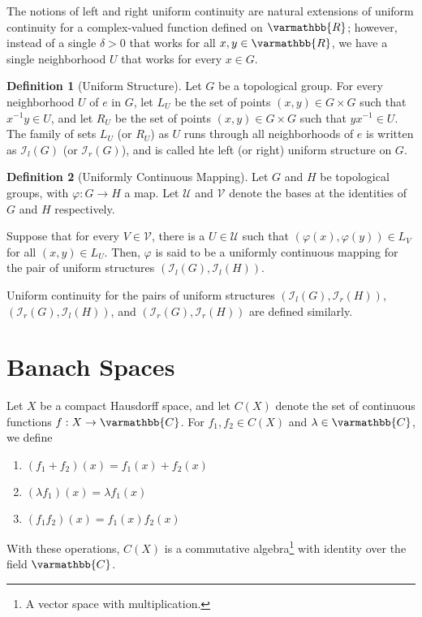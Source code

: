 \documentclass[12pt]{extarticle}
\newcommand{\R}{\mathbb{R}}
\newcommand{\C}{\mathbb{C}}
\theoremstyle{plain}
\theoremstyle{definition}
\newtheorem*{definition}{Definition}
\theoremstyle{note}
\renewcommand*{\mathbb}[1]{\varmathbb{#1}}
\renewcommand{\newline}{\hfill\break}
\begin{document}
 The notions of left and right uniform continuity are natural extensions of uniform continuity for a complex-valued function defined on $\R$; however, instead of a single $\delta > 0$ that works for all $x,y\in \R$, we have a single neighborhood $U$ that works for every $x\in G$.
 \begin{definition}[Uniform Structure]
   Let $G$ be a topological group. For every neighborhood $U$ of $e$ in $G$, let $L_{U}$ be the set of points $(x,y)\in G\times G$ such that $x^{-1}y\in U$, and let $R_U$ be the set of points $(x,y)\in G\times G$ such that $yx^{-1}\in U$. The family of sets $L_U$ (or $R_U$) as $U$ runs through all neighborhoods of $e$ is written as $\mathcal{I}_{l}\left(G\right)$ (or $\mathcal{I}_{r}\left(G\right)$), and is called hte left (or right) uniform structure on $G$.
 \end{definition}
 \begin{definition}[Uniformly Continuous Mapping]
   Let $G$ and $H$ be topological groups, with $\varphi: G\rightarrow H$ a map. Let $\mathcal{U}$ and $\mathcal{V}$ denote the bases at the identities of $G$ and $H$ respectively.\newline

   Suppose that for every $V\in \mathcal{V}$, there is a $U\in \mathcal{U}$ such that $\left(\varphi(x),\varphi(y)\right)\in L_{V}$ for all $(x,y)\in L_U$. Then, $\varphi$ is said to be a uniformly continuous mapping for the pair of uniform structures $\left(\mathcal{I}_{l}\left(G\right),\mathcal{I}_{l}\left(H\right)\right)$.\newline

   Uniform continuity for the pairs of uniform structures $\left(\mathcal{I}_l\left(G\right),\mathcal{I}_r\left(H\right)\right)$, $\left(\mathcal{I}_r\left(G\right),\mathcal{I}_l\left(H\right)\right)$, and $\left(\mathcal{I}_r\left(G\right),\mathcal{I}_r\left(H\right)\right)$ are defined similarly.
 \end{definition}
\section{Banach Spaces}%
Let $X$ be a compact Hausdorff space, and let $C(X)$ denote the set of continuous functions $f: X\rightarrow \C$. For $f_1,f_2\in C(X)$ and $\lambda\in \C$, we define
\begin{enumerate}[(1)]
  \item $\displaystyle \left(f_1 + f_2\right)(x) = f_1(x) + f_2(x)$
  \item $\displaystyle \left(\lambda f_1\right)(x) = \lambda f_1(x)$
  \item $\displaystyle \left(f_1f_2\right)(x) = f_1(x)f_2(x)$
\end{enumerate}
With these operations, $C(X)$ is a commutative algebra\footnote{A vector space with multiplication.} with identity over the field $\C$.\newline
\end{document}
